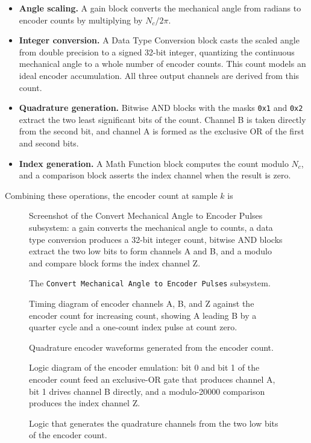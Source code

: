 \begin{itemize}
	\item \textbf{Angle scaling.} A gain block converts the mechanical angle from radians to encoder counts by multiplying by $N_c / 2\pi$.
	
	\item \textbf{Integer conversion.} A Data Type Conversion block casts the scaled angle from double precision to a signed 32-bit integer, quantizing the continuous mechanical angle to a whole number of encoder counts. This count models an ideal encoder accumulation. All three output channels are derived from this count. 
	
	\item \textbf{Quadrature generation.} Bitwise AND blocks with the masks \texttt{0x1} and \texttt{0x2} extract the two least significant bits of the count. Channel B is taken directly from the second bit, and channel A is formed as the exclusive OR of the first and second bits.
	
	\item \textbf{Index generation.} A Math Function block computes the count modulo $N_c$, and a comparison block asserts the index channel when the result is zero. 
\end{itemize}

Combining these operations, the encoder count at sample $k$ is
\begin{figure}[htbp]
	\centering
		{Screenshot of the Convert Mechanical Angle to Encoder Pulses subsystem: a gain converts the mechanical angle to counts, a data type conversion produces a 32-bit integer count, bitwise AND blocks extract the two low bits to form channels A and B, and a modulo and compare block forms the index channel Z.}
	\caption[The encoder emulation subsystem]{The \texttt{Convert Mechanical Angle to Encoder Pulses} subsystem.}
	\label{fig:encoder_emulation}
\end{figure}
\begin{figure}[htbp]
	\centering
		{Timing diagram of encoder channels A, B, and Z against the encoder count for increasing count, showing A leading B by a quarter cycle and a one-count index pulse at count zero.}
	\caption[Quadrature encoder waveforms]{Quadrature encoder waveforms generated from the encoder count.}
	\label{fig:quadrature_timing}
\end{figure}
\begin{figure}[htbp]
	\centering
		{Logic diagram of the encoder emulation: bit 0 and bit 1 of the encoder count feed an exclusive-OR gate that produces channel A, bit 1 drives channel B directly, and a modulo-20000 comparison produces the index channel Z.}
	\caption[Encoder channel generation logic]{Logic that generates the quadrature channels from the two low bits of the encoder count.}
	\label{fig:encoder_logic}
\end{figure}


